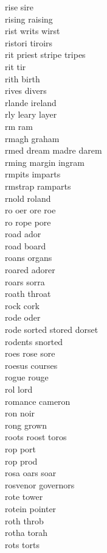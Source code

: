 rise sire\\
rising raising \\
rist writs wirst \\
ristori tiroirs\\
rit priest stripe tripes   \\
rit tir\\
rith birth \\
rives divers \\
rlande ireland \\
rly leary layer  \\
rm ram \\
rmagh graham \\
rmed dream madre darem \\
rming margin ingram \\
rmpits imparts \\
rmstrap ramparts \\
rnold roland \\
ro oer ore roe \\
ro rope pore  \\
road ador\\
road board \\
roans organs \\
roared adorer\\
roars sorra\\
roath throat \\
rock cork\\
rode oder\\
rode sorted stored dorset  \\
rodents snorted\\
roes rose sore\\
roesus courses \\
rogue rouge\\
rol lord \\
romance cameron\\
ron noir \\
rong grown \\
roots roost toros\\
rop port \\
rop prod \\
rosa oars soar\\
rosvenor governors \\
rote tower \\
rotein pointer \\
roth throb \\
rotha torah\\
rots torts \\
